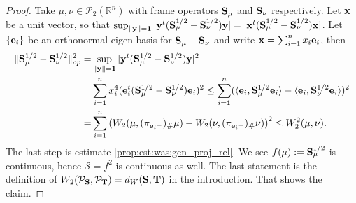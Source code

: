 \documentclass{amsart}
\numberwithin{equation}{section}
\newcommand\cP{{\mathcal P}}
\newcommand\bS{{\bf S}}
\newcommand\bT{{\bf T}}
\theoremstyle{plain}
\theoremstyle{definition}
\begin{document}
\begin{proof}
 Take $\mu, \nu \in \cP_2(\mathbb{R}^n)$ with frame operators ${\bf S}_{\mu}$ and ${\bf S}_{\nu}$ respectively. 
 Let ${\bf x}$ be a unit vector, so that   
 $\sup_{\|\bf y\|=1} |{\bf y}^t({\bf S}^{1/2}_{\mu}-{\bf S}^{1/2}_{\nu}){\bf y}|=  | {\bf x}^t({\bf S}^{1/2}_{\mu}-{\bf S}^{1/2}_{\nu}){\bf x}|$.  
 Let $\{ {\bf e}_i\}$ be an orthonormal eigen-basis for ${\bf S}_{\mu}-{\bf S}_{\nu}$ and write ${\bf x} = \sum^n_{i=1} x_i {\bf e}_i$, then %
 \begin{equation*}
     \begin{split}
 \|{\bf S}^{1/2}_{\mu}-{\bf S}^{1/2}_{\nu}\|_{op}^2 = &\sup_{\|\bf y\|=1} |{\bf y}^t({\bf S}^{1/2}_{\mu}-{\bf S}^{1/2}_{\nu}){\bf y}|^2 \\ =& 
 \sum^n_{i=1}x^4_i({\bf e}^t_i({\bf S}^{1/2}_{\mu}-{\bf S}^{1/2}_{\nu}){\bf e}_i)^2  \leq 
 \sum^n_{i=1}(\langle{\bf e}_i,{\bf S}^{1/2}_{\mu}{\bf e}_i\rangle-\langle{\bf e}_i,{\bf S}^{1/2}_{\nu}{\bf e}_i\rangle)^2 \\
 =& \sum^n_{i=1}\left(W_2(\mu, (\pi_{{{\bf e}_i}^{\perp}})_{\#}\mu) - W_2(\nu, (\pi_{{{\bf e}_i}^{\perp}})_{\#}\nu) \right)^{2}
 \leq W^2_2(\mu,\nu).
 \end{split}
  \end{equation*}
 The last step is estimate \ref{prop:est:was:gen_proj_rel}. 
 We see $f(\mu):={\bf S}^{1/2}_{\mu}$ is continuous, hence $\mathcal{S}=f^2$ is continuous as well. The last statement is the definition of 
 $W_2(\cP_{\bS},\cP_{\bT})=d_W(\bS,\bT)$ in the introduction. 
 That shows the claim. 
\end{proof}


 
\end{document}
